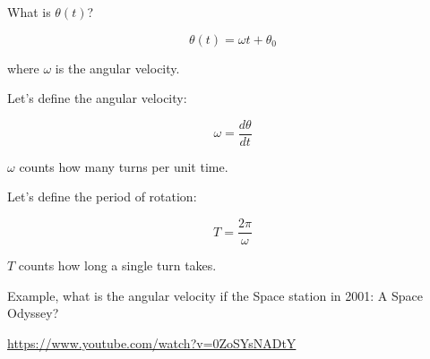 \documentclass[]{beamer}
\begin{document}
 \begin{frame}
What is $\theta(t)$?

\pause
\vspace{3mm}


\begin{equation}
  \theta(t)= \omega t +\theta_0
\end{equation}

where $\omega$ is the angular velocity.
\end{frame}

\begin{frame}

  
  Let's define the angular velocity:
  
  
  \begin{equation}
      \boxed{\omega=\frac{d \theta}{dt}}
  \end{equation}
  
  $\omega$ counts how many turns per unit time.
  \vspace{3mm}
  
  \pause
  Let's define the period of rotation:
  
  \begin{equation}
      \boxed{T=\frac{2\pi}{\omega}}
  \end{equation}
  
  $T$ counts how long a single turn takes.
  \end{frame}
  




 \begin{frame}
  Example, what is the angular velocity if the Space station in 
  2001: A Space Odyssey?

  \vspace{5mm}

  \url{https://www.youtube.com/watch?v=0ZoSYsNADtY}

    \end{frame}

\end{document}
